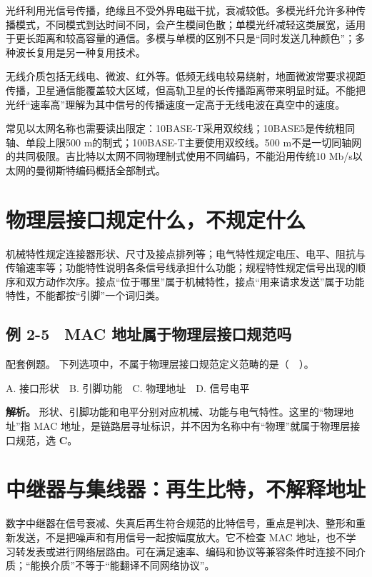 光纤利用光信号传播，绝缘且不受外界电磁干扰，衰减较低。多模光纤允许多种传播模式，不同模式到达时间不同，会产生模间色散；单模光纤减轻这类展宽，适用于更长距离和较高容量的通信。多模与单模的区别不只是``同时发送几种颜色''；多种波长复用是另一种复用技术。

无线介质包括无线电、微波、红外等。低频无线电较易绕射，地面微波常要求视距传播，卫星通信能覆盖较大区域，但高轨卫星的长传播距离带来明显时延。不能把光纤``速率高''理解为其中信号的传播速度一定高于无线电波在真空中的速度。

常见以太网名称也需要读出限定：10BASE-T采用双绞线；10BASE5是传统粗同轴、单段上限500 m的制式；100BASE-T主要使用双绞线。500 m不是一切同轴网的共同极限。吉比特以太网不同物理制式使用不同编码，不能沿用传统10 Mb/s以太网的曼彻斯特编码概括全部制式。

\section{物理层接口规定什么，不规定什么}\label{CN02-07}

机械特性规定连接器形状、尺寸及接点排列等；电气特性规定电压、电平、阻抗与传输速率等；功能特性说明各条信号线承担什么功能；规程特性规定信号出现的顺序和双方动作次序。接点``位于哪里''属于机械特性，接点``用来请求发送''属于功能特性，不能都按``引脚''一个词归类。

\subsection{例 2-5　MAC 地址属于物理层接口规范吗}\label{CN02-ex5}

\begin{example}[配套例题]

配套例题。 下列选项中，不属于物理层接口规范定义范畴的是（　）。

A. 接口形状　B. 引脚功能　C. 物理地址　D. 信号电平

\end{example}

\textbf{解析。} 形状、引脚功能和电平分别对应机械、功能与电气特性。这里的``物理地址''指 MAC 地址，是链路层寻址标识，并不因为名称中有``物理''就属于物理层接口规范，选 \textbf{C}。

\section{中继器与集线器：再生比特，不解释地址}\label{CN02-08}

数字中继器在信号衰减、失真后再生符合规范的比特信号，重点是判决、整形和重新发送，不是把噪声和有用信号一起按幅度放大。它不检查 MAC 地址，也不学习转发表或进行网络层路由。可在满足速率、编码和协议等兼容条件时连接不同介质；``能换介质''不等于``能翻译不同网络协议''。

